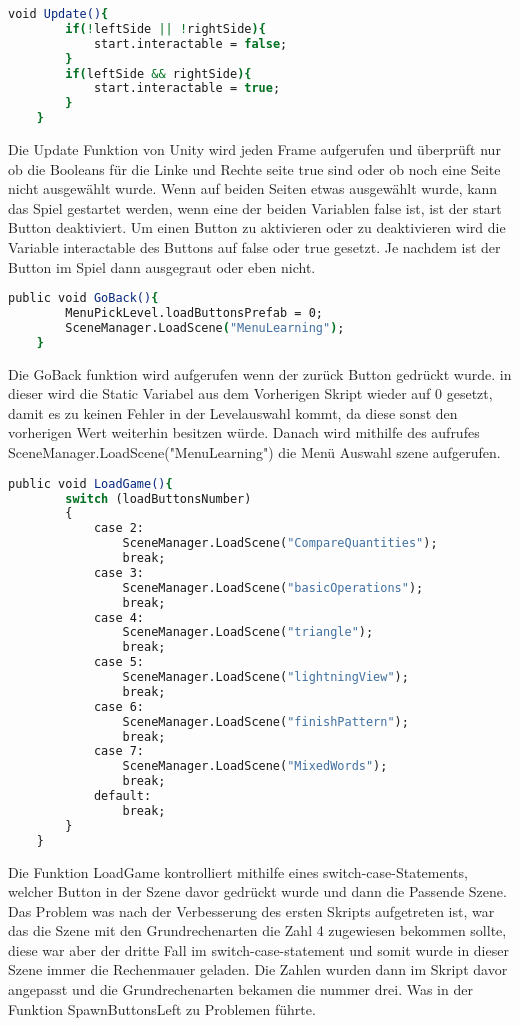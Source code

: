 \begin{lstlisting}[language=csh, caption={MenuPickLevelAdvanced.cs Update Funktion}]
	void Update(){
		if(!leftSide || !rightSide){
			start.interactable = false;
		}
		if(leftSide && rightSide){
			start.interactable = true;
		}
	}
\end{lstlisting}
Die Update Funktion von Unity wird jeden Frame aufgerufen und überprüft nur ob die Booleans für die Linke und Rechte seite true sind oder ob noch eine Seite nicht ausgewählt wurde. Wenn auf beiden Seiten etwas ausgewählt wurde, kann das Spiel gestartet werden, wenn eine der beiden Variablen false ist, ist der start Button deaktiviert. Um einen Button zu aktivieren oder zu deaktivieren wird die Variable interactable des Buttons auf false oder true gesetzt. Je nachdem ist der Button im Spiel dann ausgegraut oder eben nicht.\\
\begin{lstlisting}[language=csh, caption={MenuPickLevelAdvanced.cs GoBack Funktion}]
	public void GoBack(){
		MenuPickLevel.loadButtonsPrefab = 0;
		SceneManager.LoadScene("MenuLearning");
	}
\end{lstlisting}
Die GoBack funktion wird aufgerufen wenn der zurück Button gedrückt wurde. in dieser wird die Static Variabel aus dem Vorherigen Skript wieder auf 0 gesetzt, damit es zu keinen Fehler in der Levelauswahl kommt, da diese sonst den vorherigen Wert weiterhin besitzen würde. Danach wird mithilfe des aufrufes SceneManager.LoadScene("MenuLearning") die Menü Auswahl szene aufgerufen.
\begin{lstlisting}[language=csh, caption={MenuPickLevelAdvanced.cs LoadGame Funktion}]
	public void LoadGame(){
		switch (loadButtonsNumber)
		{
			case 2:
				SceneManager.LoadScene("CompareQuantities");
				break;
			case 3:
				SceneManager.LoadScene("basicOperations");
				break;
			case 4:
				SceneManager.LoadScene("triangle");
				break;
			case 5:
				SceneManager.LoadScene("lightningView");
				break;
			case 6:
				SceneManager.LoadScene("finishPattern");
				break;
			case 7:
				SceneManager.LoadScene("MixedWords");
				break;
			default:
				break;
		}
	}
\end{lstlisting}
Die Funktion LoadGame kontrolliert mithilfe eines switch-case-Statements, welcher Button in der Szene davor gedrückt wurde und dann die Passende Szene.\\
Das Problem was nach der Verbesserung des ersten Skripts aufgetreten ist, war das die Szene mit den Grundrechenarten die Zahl 4 zugewiesen bekommen sollte, diese war aber der dritte Fall im switch-case-statement und somit wurde in dieser Szene immer die Rechenmauer geladen. Die Zahlen wurden dann im Skript davor angepasst und die Grundrechenarten bekamen die nummer drei. Was in der Funktion SpawnButtonsLeft zu Problemen führte.\\
